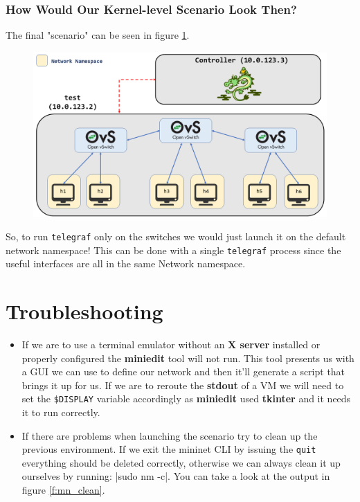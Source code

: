\documentclass[12pt]{article}
\begin{document}
		\subsubsection{How Would Our Kernel-level Scenario Look Then?}

		The final "scenario" can be seen in figure \ref{f:scenario_kernel}.

		\begin{figure}[!htb]
			\centering
			\includegraphics[width=\linewidth]{scenario_kernel.png}
			\label{f:scenario_kernel}
		\end{figure}

		So, to run \texttt{telegraf} only on the switches we would just launch it on the default network namespace! This can be done with a single \texttt{telegraf} process since the useful interfaces are all in the same Network namespace.

\newpage
\section{Troubleshooting}
	\begin{itemize}
		\item If we are to use a terminal emulator without an \textbf{X server} installed or properly configured the \textbf{miniedit} tool will not run. This tool presents us with a GUI we can use to define our network and then it'll generate a script that brings it up for us. If we are to reroute the \textbf{stdout} of a VM we will need to set the \texttt{\$DISPLAY} variable accordingly as \textbf{miniedit} used \textbf{tkinter} and it needs it to run correctly.
		\item If there are problems when launching the scenario try to clean up the previous environment. If we exit the mininet CLI by issuing the \texttt{quit} everything should be deleted correctly, otherwise we can always clean it up ourselves by running: |sudo nm -c|. You can take a look at the output in figure \ref{f:mn_clean}.
	\end{itemize}
\end{document}
